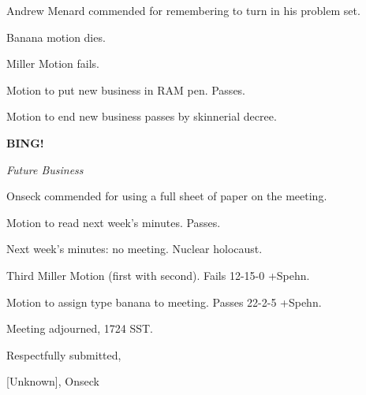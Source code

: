 \documentclass[12pt]{article}
\newcommand{\bing}{{\bf BING!} }
\newcommand{\goto}[1]{\bing \vskip 12pt \centerline{{\em{#1}}}}
\begin{document}
Andrew Menard commended for remembering to turn in his problem set.

Banana motion dies.

Miller Motion fails.

Motion to put new business in RAM pen. Passes.

Motion to end new business passes by skinnerial decree.

\goto{Future Business}

Onseck commended for using a full sheet of paper on the meeting.

Motion to read next week's minutes. Passes.

Next week's minutes: no meeting. Nuclear holocaust.

Third Miller Motion (first with second). Fails 12-15-0 +Spehn.

Motion to assign type banana to meeting. Passes 22-2-5 +Spehn.

\vspace{12pt}

\noindent
Meeting adjourned, 1724 SST.

\vspace{18pt}

\centerline{Respectfully submitted,}
\centerline{[Unknown], Onseck}
\end{document}
